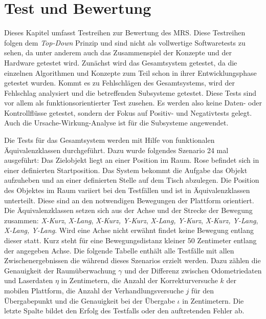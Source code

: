 \section{Test und Bewertung}
\label{sec:test}
Dieses Kapitel umfasst Testreihen zur Bewertung des MRS. Diese Testreihen folgen dem \textit{Top-Down} Prinzip und sind nicht als vollwertige Softwaretests zu sehen, da unter anderem auch das Zusammenspiel der Konzepte und der Hardware getestet wird. Zunächst wird das Gesamtsystem getestet, da die einzelnen Algorithmen und Konzepte zum Teil schon in ihrer Entwicklungsphase getestet wurden. Kommt es zu Fehlschlägen des Gesamtsystems, wird der Fehlschlag analysiert und die betreffenden Subsysteme getestet. Diese Tests sind vor allem als funktionsorientierter Test zusehen. Es werden also keine Daten- oder Kontrollflüsse getestet, sondern der Fokus auf Positiv- und Negativtests gelegt. Auch die Ursache-Wirkung-Analyse ist für die Subsysteme angewendet. 

Die Tests für das Gesamtsystem werden mit Hilfe von funktionalen Äquivalenzklassen durchgeführt. Dazu wurde folgendes Szenario 24 mal ausgeführt: Das Zielobjekt liegt an einer Position im Raum. Rose befindet sich in einer definierten Startposition. Das System bekommt die Aufgabe das Objekt aufzuheben und an einer definierten Stelle auf dem Tisch abzulegen. Die Position des Objektes im Raum variiert bei den Testfällen und ist in Äquivalenzklassen unterteilt. Diese sind an den notwendigen Bewegungen der Plattform orientiert. Die Äquivalenzklassen setzen sich aus der Achse und der Strecke der Bewegung zusammen: \textit{ X-Kurz}, \textit{ X-Lang}, \textit{ X-Kurz, Y-Kurz}, \textit{ X-Lang, Y-Kurz}, \textit{ X-Kurz, Y-Lang}, \textit{ X-Lang, Y-Lang}. Wird eine Achse nicht erwähnt findet keine Bewegung entlang dieser statt. Kurz steht für eine Bewegungsdistanz kleiner 50 Zentimeter entlang der angegeben Achse. Die folgende Tabelle enthält alle Testfälle mit allen Zwischenergebnissen die während dieses Szenarios erzielt werden. Dazu zählen die Genauigkeit der Raumüberwachung $\gamma$ und der Differenz zwischen Odometriedaten und Laserdaten $\eta$ in Zentimetern, die Anzahl der Korrekturversuche $k$ der mobilen Plattform, die Anzahl der Verhandlungsversuche $j$ für den Übergabepunkt und die Genauigkeit bei der Übergabe $\iota$ in Zentimetern. Die letzte Spalte bildet den Erfolg des Testfalls oder den auftretenden Fehler ab.

